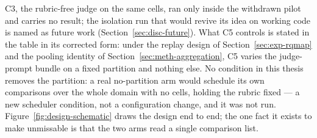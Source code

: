 C3, the rubric-free judge on the same cells, ran
only inside the withdrawn pilot and carries no result; the isolation
run that would revive its idea on working code is named as future
work (Section~\ref{sec:disc-future}). What C5 controls is stated in
the table in its corrected form: under the replay design of
Section~\ref{sec:exp-rqmap} and the pooling identity of
Section~\ref{sec:meth-aggregation}, C5 varies the judge-prompt bundle
on a fixed partition and nothing else. No
condition in this thesis removes the partition: a real no-partition
arm would schedule its own comparisons over the whole domain with no
cells, holding the rubric fixed --- a new scheduler condition, not a
configuration change, and it was not run.
Figure~\ref{fig:design-schematic} draws the design end to end; the
one fact it exists to make unmissable is that the two arms read a
single comparison list.

